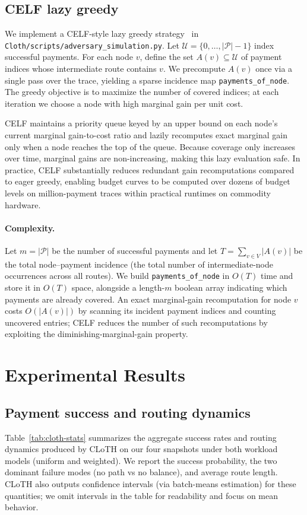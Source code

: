 \documentclass{article}
\begin{document}
\subsection{CELF lazy greedy}
We implement a CELF-style lazy greedy strategy~\cite{leskovec07cost} in \texttt{Cloth/scripts/adversary\_simulation.py}.
Let $\mathcal{U}=\{0,\ldots,|\mathcal{P}|-1\}$ index successful payments. For each node $v$, define the set $A(v)\subseteq \mathcal{U}$ of payment indices whose intermediate route contains $v$.
We precompute $A(v)$ once via a single pass over the trace, yielding a sparse incidence map \texttt{payments\_of\_node}.
The greedy objective is to maximize the number of covered indices; at each iteration we choose a node with high marginal gain per unit cost.

CELF maintains a priority queue keyed by an upper bound on each node's current marginal gain-to-cost ratio and lazily recomputes exact marginal gain only when a node reaches the top of the queue.
Because coverage only increases over time, marginal gains are non-increasing, making this lazy evaluation safe.
In practice, CELF substantially reduces redundant gain recomputations compared to eager greedy, enabling budget curves to be computed over dozens of budget levels on million-payment traces within practical runtimes on commodity hardware.

\paragraph{Complexity.}
Let $m=|\mathcal{P}|$ be the number of successful payments and let $T=\sum_{v\in V}|A(v)|$ be the total node--payment incidence (the total number of intermediate-node occurrences across all routes).
We build \texttt{payments\_of\_node} in $O(T)$ time and store it in $O(T)$ space, alongside a length-$m$ boolean array indicating which payments are already covered.
An exact marginal-gain recomputation for node $v$ costs $O(|A(v)|)$ by scanning its incident payment indices and counting uncovered entries; CELF reduces the number of such recomputations by exploiting the diminishing-marginal-gain property.

\section{Experimental Results}
\label{sec:results}

\subsection{Payment success and routing dynamics}
Table~\ref{tab:cloth-stats} summarizes the aggregate success rates and routing dynamics produced by CLoTH on our four snapshots under both workload models (uniform and weighted).
We report the success probability, the two dominant failure modes (no path vs no balance), and average route length.
CLoTH also outputs confidence intervals (via batch-means estimation) for these quantities; we omit intervals in the table for readability and focus on mean behavior.
\end{document}
